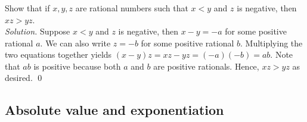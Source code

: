 \documentclass{amsart}
\theoremstyle{definition}
\newcommand{\soln}{\newline\textit{Solution.} }
\begin{document}
\subsubsection{} Show that if $x,y,z$ are rational numbers such that $x<y$ and $z$ is negative, then $xz>yz$. \\
\soln Suppose $x<y$ and $z$ is negative, then $x-y=-a$ for some positive rational $a$. We can also write $z=-b$ for some positive rational $b$. Multiplying the two equations together yields $(x-y)z=xz-yz=(-a)(-b)=ab$. Note that $ab$ is positive because both $a$ and $b$ are positive rationals. Hence, $xz>yz$ as desired. \qed \\

\subsection{Absolute value and exponentiation} 
\end{document}

